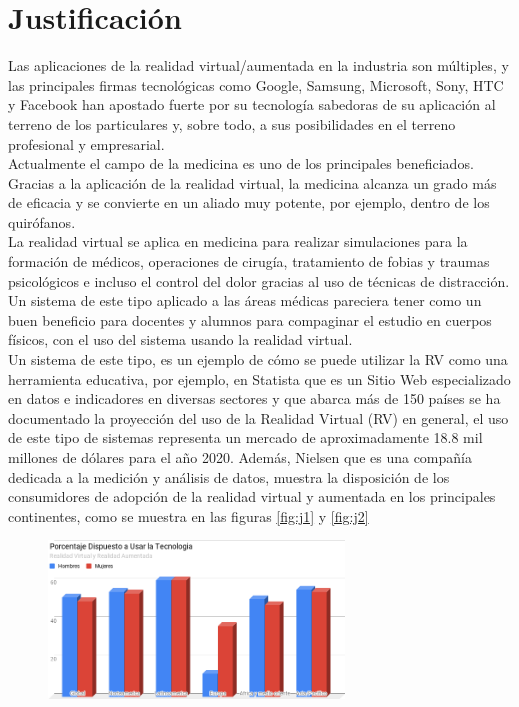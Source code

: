 \section{Justificación}
Las aplicaciones de la realidad virtual/aumentada en la industria son múltiples, y las principales firmas tecnológicas como Google, Samsung, Microsoft, 
Sony, HTC y Facebook han apostado fuerte por su tecnología sabedoras de su aplicación al terreno de los particulares y, sobre todo, a sus posibilidades 
en el terreno profesional y empresarial.\\
Actualmente el campo de la medicina es uno de los principales beneficiados. Gracias a la aplicación de la realidad virtual, la medicina alcanza un grado más de eficacia 
y se convierte en un aliado muy potente, por ejemplo, dentro de los quirófanos.\\
La realidad virtual se aplica en medicina para realizar simulaciones para la formación de médicos, operaciones de cirugía, tratamiento de fobias y traumas 
psicológicos e incluso el control del dolor gracias al uso de técnicas de distracción.\\
Un sistema de este tipo aplicado a las áreas médicas pareciera tener como un buen beneficio para docentes y alumnos para compaginar el estudio en cuerpos físicos, con 
el uso del sistema usando la realidad virtual\cite{norton1994integrating}.\\
Un sistema de este tipo, es un ejemplo de cómo se puede utilizar la RV como una herramienta educativa, por ejemplo,  en Statista\cite{web1} que es un Sitio Web especializado 
en datos e indicadores en diversas sectores y que abarca más de 150 países se ha documentado la proyección del uso de la Realidad Virtual (RV) en general, el 
uso de este tipo de sistemas  representa un mercado de aproximadamente 18.8 mil millones de dólares para el año 2020. Además, Nielsen\cite{web2} que es una compañía dedicada 
a la medición y análisis de datos,  muestra la disposición de los consumidores de adopción de la realidad virtual y aumentada en los principales continentes, como se muestra en las figuras \ref{fig:j1} y \ref{fig:j2}
\begin{figure}[H]
	\begin{center}
 		\includegraphics[width = 0.7\textwidth]{v3/images/chart2.png}
	\end{center} 
\end{figure}

